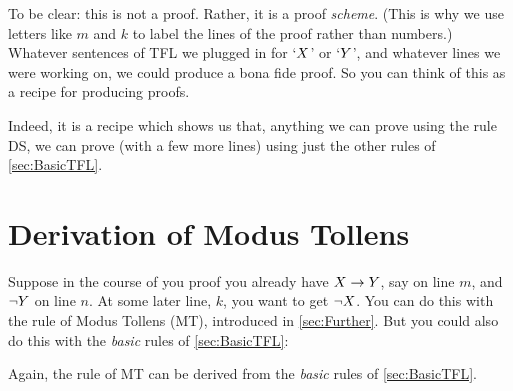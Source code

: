 To be clear: this is not a proof. Rather, it is a proof \emph{scheme}.
(This is why we use letters like $m$ and $k$ to label the lines of the proof rather than numbers.)
Whatever sentences of TFL we plugged in for `$X$' or `$Y$', and whatever lines we were working on, we could produce a bona fide proof. So you can think of this as a recipe for producing proofs.

Indeed, it is a recipe which shows us that, anything we can prove using the rule DS, we can prove (with a few more lines) using just the other rules of \cref{sec:BasicTFL}.
%

\section{Derivation of Modus Tollens}
Suppose in the course of you proof you already have $X\rightarrow Y$, say on line $m$, and $\neg Y$ on line $n$. At some later line, $k$, you want to get $\neg X$.
 You can do this with the rule of Modus Tollens (MT), introduced in \cref{sec:Further}. But you could also do this with the \emph{basic} rules of \cref{sec:BasicTFL}:

\begin{fitchproof}
		\open
		\close
\end{fitchproof}
Again, the rule of MT can be derived from the \emph{basic} rules of \cref{sec:BasicTFL}.



